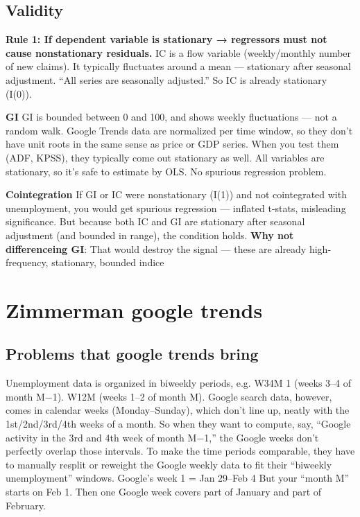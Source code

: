 \documentclass{article}
\begin{document}
\subsection{Validity}
\textbf{Rule 1: If dependent variable is stationary → regressors must not cause nonstationary residuals.}
IC is a flow variable (weekly/monthly number of new claims). It typically fluctuates around a mean — stationary after seasonal adjustment. “All series are seasonally adjusted.” So IC is already stationary (I(0)).

\textbf{GI}
GI is bounded between 0 and 100, and shows weekly fluctuations — not a random walk.
Google Trends data are normalized per time window, so they don’t have unit roots in the same sense as price or GDP series.
When you test them (ADF, KPSS), they typically come out stationary as well.
All variables are stationary, so it’s safe to estimate by OLS.
No spurious regression problem.


\textbf{Cointegration}
If GI or IC were nonstationary (I(1)) and not cointegrated with unemployment,
you would get spurious regression — inflated t-stats, misleading significance. But because both IC and GI are stationary after seasonal adjustment (and bounded in range), the condition holds.
\textbf{Why not differenceing GI}: That would destroy the signal — these are already high-frequency, stationary, bounded indice


\section{Zimmerman google trends}

\subsection{Problems that google trends bring}
Unemployment data is organized in biweekly periods, e.g. W34M 1 (weeks 3–4 of month M−1). W12M (weeks 1–2 of month M).
Google search data, however, comes in calendar weeks (Monday–Sunday), which don’t line up, neatly with the 1st/2nd/3rd/4th weeks of a month. So when they want to compute, say, “Google activity in the 3rd and 4th week of month M−1,” the Google weeks don’t perfectly overlap those intervals.
To make the time periods comparable, they have to manually resplit or reweight the Google weekly data to fit their “biweekly unemployment” windows.
Google’s week 1 = Jan 29–Feb 4 But your “month M” starts on Feb 1.
Then one Google week covers part of January and part of February.
\end{document}
